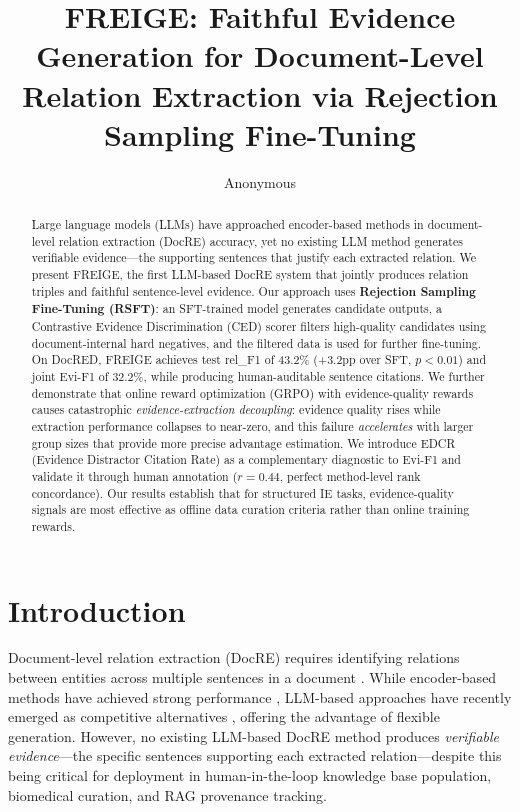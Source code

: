 \documentclass[11pt]{article}
\title{FREIGE: Faithful Evidence Generation for Document-Level Relation Extraction via Rejection Sampling Fine-Tuning}
\author{Anonymous}
\newcommand{\method}{FREIGE}
\newcommand{\ced}{CED}
\newcommand{\rsft}{RSFT}
\begin{document}
\maketitle

\begin{abstract}
Large language models (LLMs) have approached encoder-based methods in document-level relation extraction (DocRE) accuracy, yet no existing LLM method generates verifiable evidence---the supporting sentences that justify each extracted relation.
We present \method{}, the first LLM-based DocRE system that jointly produces relation triples and faithful sentence-level evidence.
Our approach uses \textbf{Rejection Sampling Fine-Tuning (\rsft{})}: an SFT-trained model generates candidate outputs, a Contrastive Evidence Discrimination (\ced{}) scorer filters high-quality candidates using document-internal hard negatives, and the filtered data is used for further fine-tuning.
On DocRED, \method{} achieves test rel\_F1 of 43.2\% (+3.2pp over SFT, $p{<}0.01$) and joint Evi-F1 of 32.2\%, while producing human-auditable sentence citations.
We further demonstrate that online reward optimization (GRPO) with evidence-quality rewards causes catastrophic \emph{evidence-extraction decoupling}: evidence quality rises while extraction performance collapses to near-zero, and this failure \emph{accelerates} with larger group sizes that provide more precise advantage estimation.
We introduce EDCR (Evidence Distractor Citation Rate) as a complementary diagnostic to Evi-F1 and validate it through human annotation ($r{=}0.44$, perfect method-level rank concordance).
Our results establish that for structured IE tasks, evidence-quality signals are most effective as offline data curation criteria rather than online training rewards.
\end{abstract}

\section{Introduction}

Document-level relation extraction (DocRE) requires identifying relations between entities across multiple sentences in a document \cite{yao2019docred}.
While encoder-based methods have achieved strong performance \cite{zhou2021atlop,ma2023dreeam,xiao2022sais}, LLM-based approaches have recently emerged as competitive alternatives \cite{xu2024lmrc}, offering the advantage of flexible generation.
However, no existing LLM-based DocRE method produces \emph{verifiable evidence}---the specific sentences supporting each extracted relation---despite this being critical for deployment in human-in-the-loop knowledge base population, biomedical curation, and RAG provenance tracking.
\end{document}
